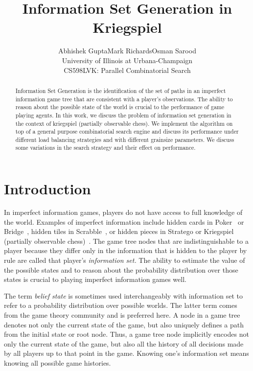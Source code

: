\documentclass[11pt]{article}
\begin{document}
\title{Information Set Generation in Kriegspiel}
\author{Abhishek Gupta\qquad Mark Richards\qquad Osman Sarood\\University of Illinois at Urbana-Champaign\\CS598LVK: Parallel Combinatorial Search}
\maketitle

\begin{abstract}
Information Set Generation is the identification of the set of paths in an imperfect information game tree that are consistent with a player's observations.  The ability to reason about the possible state of the world is crucial to the performance of game playing agents.  In this work, we discuss the problem of information set generation in the context of kriegspiel (partially observable chess).  We implement the algorithm on top of a general purpose combinatorial search engine and discuss its performance under different load balancing strategies and with different grainsize parameters.  We discuss some variations in the search strategy and their effect on performance.
\end{abstract}

\section{Introduction}
In imperfect information games, players do not have access to full knowledge of the world. Examples of imperfect information include hidden cards in Poker~\cite{billings02challenge} or Bridge~\cite{ginsberg96partition}, hidden tiles in Scrabble~\cite{richards07opponent}, or hidden pieces in Stratego or Kriegspiel (partially observable chess)~\cite{li94chess}. The game tree nodes that are indistinguishable to a player because they differ only in the information that is hidden to the player by rule are called that player's {\em information set.}  The ability to estimate the value of the possible states and to reason about the probability distribution over those states is crucial to playing imperfect information games well. 

The term {\em belief state} is sometimes used interchangeably with information set to refer to a probability distribution over possible worlds.  The latter term comes from the game theory community and is preferred here.  A node in a game tree denotes not only the current state of the game, but also uniquely defines a path from the initial state or root node.  Thus, a game tree node implicitly encodes not only the current state of the game, but also all the history of all decisions made by all players up to that point in the game.  Knowing one's information set means knowing all possible game histories.
\end{document}

